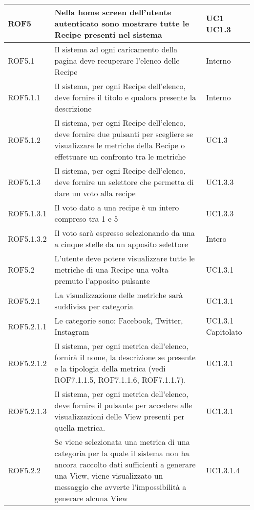 \begin{center}
\begin{longtable}{| p{2.5cm} | p{8cm} | p{2cm} |}
		\hline
		ROF5  &  Nella home screen dell'utente autenticato sono mostrare tutte le Recipe presenti nel sistema & UC1 \newline UC1.3 \\
		\hline
		ROF5.1  & Il sistema ad ogni caricamento della pagina deve recuperare l'elenco delle Recipe  &  Interno \\
		\hline
		ROF5.1.1  & Il sistema, per ogni Recipe dell'elenco, deve fornire il titolo e qualora presente la descrizione  &  Interno \\
		\hline
		ROF5.1.2  & Il sistema, per ogni Recipe dell'elenco, deve fornire due pulsanti per scegliere se visualizzare le metriche della Recipe o effettuare un confronto tra le metriche &  UC1.3 \\
		\hline
		ROF5.1.3  & Il sistema, per ogni Recipe dell'elenco, deve fornire un selettore che permetta di dare un voto alla recipe &  UC1.3.3 \\
		\hline
		ROF5.1.3.1  & Il voto dato a una recipe è un intero compreso tra 1 e 5 &  UC1.3.3 \\
		\hline
		ROF5.1.3.2  & Il voto sarà espresso selezionando da una a cinque stelle da un apposito selettore &  Intero \\
		\hline
		ROF5.2  &  L'utente deve potere visualizzare tutte le metriche di una Recipe una volta premuto l'apposito pulsante  &  UC1.3.1 \\
		\hline
		ROF5.2.1  &  La visualizzazione delle metriche sarà suddivisa per categoria  &  UC1.3.1 \\
		\hline
		ROF5.2.1.1  &  Le categorie sono: Facebook, Twitter, Instagram &  UC1.3.1 \newline Capitolato \\
		\hline
		ROF5.2.1.2  &  Il sistema, per ogni metrica dell'elenco, fornirà il nome, la descrizione se presente e la tipologia della metrica (vedi ROF7.1.1.5, ROF7.1.1.6, ROF7.1.1.7). &  UC1.3.1 \\
		\hline
		ROF5.2.1.3  &  Il sistema, per ogni metrica dell'elenco, deve fornire il pulsante per accedere alle visualizzazioni delle View presenti per quella metrica. &  UC1.3.1 \\
		\hline
		ROF5.2.2 & Se viene selezionata una metrica di una categoria per la quale il sistema non ha ancora raccolto dati sufficienti a generare una View, viene visualizzato un messaggio che avverte l'impossibilità a generare alcuna View &  UC1.3.1.4  \\
		\hline





\end{longtable}
\end{center}
